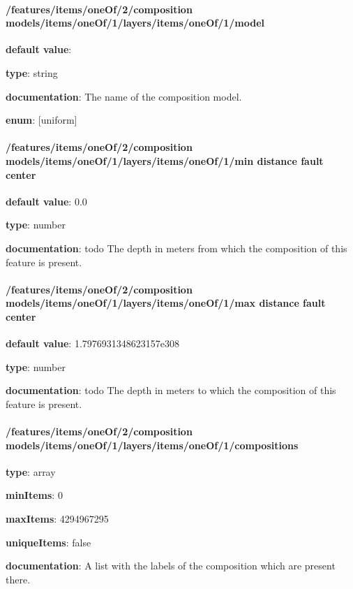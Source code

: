 \paragraph{/features/items/oneOf/2/composition models/items/oneOf/1/layers/items/oneOf/1/model} \begin{itemized}
\item {\bf default value}: 
\item {\bf type}: string
\item {\bf documentation}: The name of the composition model.
\item {\bf enum}: [uniform]\end{itemized}\paragraph{/features/items/oneOf/2/composition models/items/oneOf/1/layers/items/oneOf/1/min distance fault center} \begin{itemized}
\item {\bf default value}: 0.0
\item {\bf type}: number
\item {\bf documentation}: todo The depth in meters from which the composition of this feature is present.
\end{itemized}\paragraph{/features/items/oneOf/2/composition models/items/oneOf/1/layers/items/oneOf/1/max distance fault center} \begin{itemized}
\item {\bf default value}: 1.7976931348623157e308
\item {\bf type}: number
\item {\bf documentation}: todo The depth in meters to which the composition of this feature is present.
\end{itemized}\paragraph{/features/items/oneOf/2/composition models/items/oneOf/1/layers/items/oneOf/1/compositions} \begin{itemized}
\item {\bf type}: array
\item {\bf minItems}: 0
\item {\bf maxItems}: 4294967295
\item {\bf uniqueItems}: false
\item {\bf documentation}: A list with the labels of the composition which are present there.

\end{itemized}
